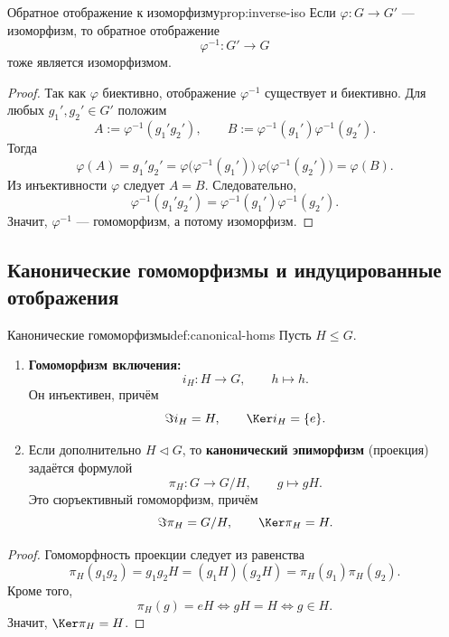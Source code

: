 \begin{Proposition}{Обратное отображение к изоморфизму}{prop:inverse-iso}
	Если $\varphi\colon G\to G'$ --- изоморфизм, то обратное отображение
	\[
	\varphi^{-1}\colon G'\to G
	\]
	тоже является изоморфизмом.
\end{Proposition}

\begin{proof}
	Так как $\varphi$ биективно, отображение $\varphi^{-1}$ существует и биективно. Для любых $g_1',g_2'\in G'$ положим
	\[
	A:=\varphi^{-1}(g_1'g_2'), \qquad B:=\varphi^{-1}(g_1')\varphi^{-1}(g_2').
	\]
	Тогда
	\[
	\varphi(A)=g_1'g_2'=
	\varphi\bigl(\varphi^{-1}(g_1')\bigr)\,\varphi\bigl(\varphi^{-1}(g_2')\bigr)=\varphi(B).
	\]
	Из инъективности $\varphi$ следует $A=B$. Следовательно,
	\[
	\varphi^{-1}(g_1'g_2')=\varphi^{-1}(g_1')\varphi^{-1}(g_2').
	\]
	Значит, $\varphi^{-1}$ --- гомоморфизм, а потому изоморфизм.
\end{proof}

\subsection{Канонические гомоморфизмы и индуцированные отображения}

\begin{Definition}{Канонические гомоморфизмы}{def:canonical-homs}
	Пусть $H\le G$.
	\begin{enumerate}
		\item \textbf{Гомоморфизм включения:}
		\[
		i_H\colon H\to G, \qquad h\mapsto h.
		\]
		Он инъективен, причём
		\[
		\Im i_H = H, \qquad \Ker i_H = \{e\}.
		\]
		\item Если дополнительно $H\triangleleft G$, то \textbf{канонический эпиморфизм} (проекция) задаётся формулой
		\[
		\pi_H\colon G\to G/H, \qquad g\mapsto gH.
		\]
		Это сюръективный гомоморфизм, причём
		\[
		\Im \pi_H = G/H, \qquad \Ker \pi_H = H.
		\]
	\end{enumerate}
\end{Definition}

\begin{proof}
	Гомоморфность проекции следует из равенства
	\[
	\pi_H(g_1g_2)=g_1g_2H=(g_1H)(g_2H)=\pi_H(g_1)\pi_H(g_2).
	\]
	Кроме того,
	\[
	\pi_H(g)=eH \Longleftrightarrow gH=H \Longleftrightarrow g\in H.
	\]
	Значит, $\Ker \pi_H=H$.
\end{proof}

